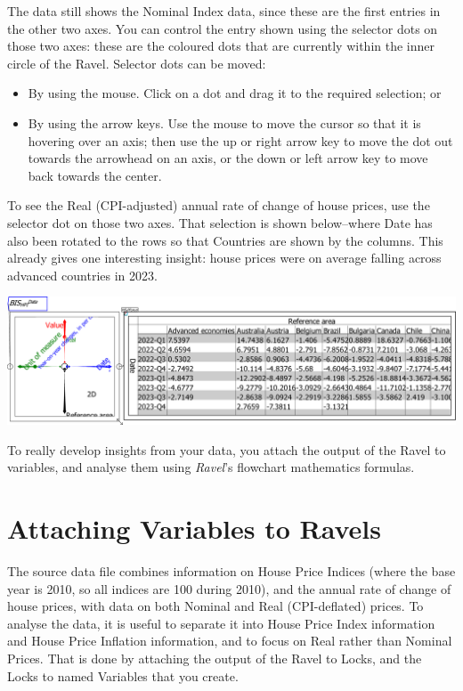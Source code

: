 The data still shows the Nominal Index data, since these are the first
entries in the other two axes. You can control the entry shown using
the selector dots on those two axes: these are the coloured dots that
are currently within the inner circle of the Ravel. Selector dots
can be moved:
\begin{itemize}
\item By using the mouse. Click on a dot and drag it to the required selection;
or 
\item By using the arrow keys. Use the mouse to move the cursor so that
it is hovering over an axis; then use the up or right arrow key to
move the dot out towards the arrowhead on an axis, or the down or
left arrow key to move back towards the center. 
\end{itemize}
To see the Real (CPI-adjusted) annual rate of change of house prices,
use the selector dot on those two axes. That selection is shown below--where
Date has also been rotated to the rows so that Countries are shown
by the columns. This already gives one interesting insight: house
prices were on average falling across advanced countries in 2023.

\includegraphics[width=15cm]{images/tut04HPI4DwithSheetRotatedCountryDateRealChange}

To really develop insights from your data, you attach the output of
the Ravel to variables, and analyse them using \emph{Ravel}'s flowchart
mathematics formulas.

\section{Attaching Variables to Ravels}

The source data file combines information on House Price Indices (where
the base year is 2010, so all indices are 100 during 2010), and the
annual rate of change of house prices, with data on both Nominal and
Real (CPI-deflated) prices. To analyse the data, it is useful to separate
it into House Price Index information and House Price Inflation information,
and to focus on Real rather than Nominal Prices. That is done by attaching
the output of the Ravel to Locks, and the Locks to named Variables
that you create.

